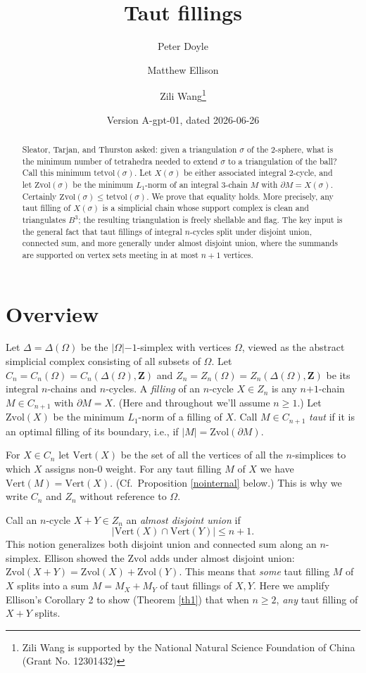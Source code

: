 \documentclass[12pt]{article}
\title{Taut fillings}
\author{Peter Doyle \and Matthew Ellison \and Zili Wang\thanks{
Zili Wang is supported by
the National Natural Science Foundation of China (Grant No. 12301432)
}}
\date{Version A-gpt-01, dated 2026-06-26}
\def\ZZ{\mathbf{Z}}
\def\del{\partial}
\newcommand{\kw}{\mathrm}
\newcommand{\vertices}{\kw{Vert}}
\newcommand{\Zvol}{\kw{Zvol}}
\newcommand{\tetvol}{\kw{tetvol}}
\newcommand{\pls}{\mathord{+}}
\newcommand{\mns}{\mathord{-}}
\begin{document}
\maketitle

\begin{abstract}
Sleator, Tarjan, and Thurston asked: given a triangulation $\sigma$ of the
$2$-sphere, what is the minimum number of tetrahedra needed to extend
$\sigma$ to a triangulation of the ball?  Call this minimum $\tetvol(\sigma)$.
Let $X(\sigma)$ be either associated integral $2$-cycle, and let
$\Zvol(\sigma)$ be the minimum $L_1$-norm of an integral $3$-chain $M$ with
$\del M=X(\sigma)$.  Certainly $\Zvol(\sigma)\leq \tetvol(\sigma)$.  We prove
that equality holds.  More precisely, any taut filling of $X(\sigma)$ is a
simplicial chain whose support complex is clean and triangulates $B^3$; the
resulting triangulation is freely shellable and flag.  The key input is the
general fact that taut fillings of integral $n$-cycles split under disjoint
union, connected sum, and more generally under almost disjoint union, where
the summands are supported on vertex sets meeting in at most $n+1$ vertices.
\end{abstract}

\section{Overview}
Let $\Delta = \Delta(\Omega)$ be the $|\Omega|\mns 1$-simplex
with vertices $\Omega$,
viewed as the abstract simplicial complex consisting of all subsets of
$\Omega$.
Let $C_n=C_n(\Omega)=C_n(\Delta(\Omega),\ZZ)$
and $Z_n=Z_n(\Omega)=Z_n(\Delta(\Omega),\ZZ)$
be its integral $n$-chains and $n$-cycles.
A \emph{filling} of an $n$-cycle $X \in Z_n$ is any
$n\pls 1$-chain $M \in C_{n+1}$ with $\del M = X$.
(Here and throughout we'll assume $n\geq 1$.)
Let $\Zvol(X)$ be the minimum $L_1$-norm of a filling of $X$.
Call $M \in C_{n+1}$ \emph{taut} if it is an optimal filling
of its boundary, i.e., if $|M|=\Zvol(\del M)$.

For $X \in C_n$ let
$\vertices(X)$ be the set of all the vertices of all the $n$-simplices
to which $X$ assigns non-$0$ weight.
For any taut filling $M$ of $X$ we have $\vertices(M) = \vertices(X)$.
(Cf.\ Proposition \ref{nointernal} below.)
This is why we write $C_n$ and $Z_n$ without reference to $\Omega$.

Call an $n$-cycle $X+Y \in Z_n$ an \emph{almost disjoint union} if
\[
|\vertices(X) \cap \vertices(Y)| \leq n+1
.
\]
This notion generalizes both disjoint union and connected sum
along an $n$-simplex.
Ellison \cite{ellison:gap}
showed the $\Zvol$ adds under almost disjoint union:
$\Zvol(X+Y) = \Zvol(X) + \Zvol(Y)$.
This means that \emph{some} taut filling $M$ of $X$ splits into a sum
$M=M_X+M_Y$ of taut fillings of $X,Y$.
Here we amplify Ellison's Corollary 2 to show (Theorem \ref{th1})
that when $n \geq 2$, \emph{any} taut filling of $X+Y$ splits.
\end{document}
